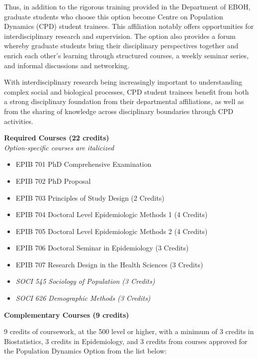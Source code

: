 \documentclass[
]{book}
\providecommand{\tightlist}{%
  \setlength{\itemsep}{0pt}\setlength{\parskip}{0pt}}
\begin{document}
Thus, in addition to the rigorous training provided in the Department of EBOH, graduate students who choose this option become Centre on Population Dynamics (CPD) student trainees. This affiliation notably offers opportunities for interdisciplinary research and supervision. The option also provides a forum whereby graduate students bring their disciplinary perspectives together and enrich each other's learning through structured courses, a weekly seminar series, and informal discussions and networking.

With interdisciplinary research being increasingly important to understanding complex social and biological processes, CPD student trainees benefit from both a strong disciplinary foundation from their departmental affiliations, as well as from the sharing of knowledge across disciplinary boundaries through CPD activities.

\textbf{Required Courses (22 credits)}\\
\emph{Option-specific courses are italicized}

\begin{itemize}
\tightlist
\item
  EPIB 701 PhD Comprehensive Examination
\item
  EPIB 702 PhD Proposal
\item
  EPIB 703 Principles of Study Design (2 Credits)
\item
  EPIB 704 Doctoral Level Epidemiologic Methods 1 (4 Credits)
\item
  EPIB 705 Doctoral Level Epidemiologic Methods 2 (4 Credits)
\item
  EPIB 706 Doctoral Seminar in Epidemiology (3 Credits)
\item
  EPIB 707 Research Design in the Health Sciences (3 Credits)
\item
  \emph{SOCI 545 Sociology of Population (3 Credits)}
\item
  \emph{SOCI 626 Demographic Methods (3 Credits)}
\end{itemize}

\textbf{Complementary Courses (9 credits)}

9 credits of coursework, at the 500 level or higher, with a minimum of 3 credits in Biostatistics, 3 credits in Epidemiology, and 3 credits from courses approved for the Population Dynamics Option from the list below:
\end{document}
